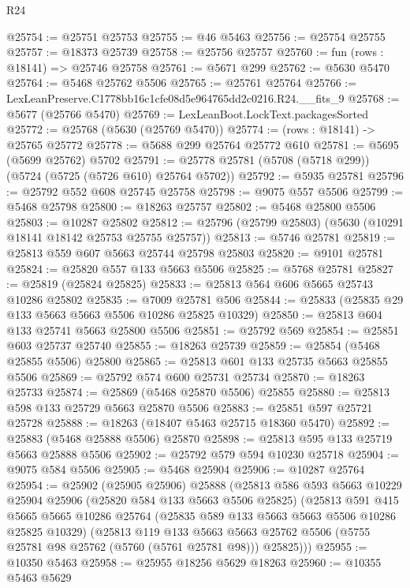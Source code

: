 \begin{lexlean}{R24}
\begin{coremodule}
@25754 := @25751 @25753
@25755 := @46 @5463
@25756 := @25754 @25755
@25757 := @18373 @25739
@25758 := @25756 @25757
@25760 := fun (rows : @18141) => @25746 @25758
@25761 := @5671 @299
@25762 := @5630 @5470
@25764 := @5468 @25762 @5506
@25765 := @25761 @25764
@25766 := LexLeanPreserve.C1778bb16c1cfe08d5e964765dd2c0216.R24.__fits_9
@25768 := @5677 (@25766 @5470)
@25769 := LexLeanBoot.LockText.packagesSorted
@25772 := @25768 (@5630 (@25769 @5470))
@25774 := (rows : @18141) -> @25765 @25772
@25778 := @5688 @299 @25764 @25772 @610
@25781 := @5695 (@5699 @25762) @5702
@25791 := @25778 @25781 (@5708 (@5718 @299)) (@5724 (@5725 (@5726 @610) @25764 @5702))
@25792 := @5935 @25781
@25796 := @25792 @552 @608 @25745 @25758
@25798 := @9075 @557 @5506
@25799 := @5468 @25798
@25800 := @18263 @25757
@25802 := @5468 @25800 @5506
@25803 := @10287 @25802
@25812 := @25796 (@25799 @25803) (@5630 (@10291 @18141 @18142 @25753 @25755 @25757))
@25813 := @5746 @25781
@25819 := @25813 @559 @607 @5663 @25744 @25798 @25803
@25820 := @9101 @25781
@25824 := @25820 @557 @133 @5663 @5506
@25825 := @5768 @25781
@25827 := @25819 (@25824 @25825)
@25833 := @25813 @564 @606 @5665 @25743 @10286 @25802
@25835 := @7009 @25781 @506
@25844 := @25833 (@25835 @29 @133 @5663 @5663 @5506 @10286 @25825 @10329)
@25850 := @25813 @604 @133 @25741 @5663 @25800 @5506
@25851 := @25792 @569
@25854 := @25851 @603 @25737 @25740
@25855 := @18263 @25739
@25859 := @25854 (@5468 @25855 @5506) @25800
@25865 := @25813 @601 @133 @25735 @5663 @25855 @5506
@25869 := @25792 @574 @600 @25731 @25734
@25870 := @18263 @25733
@25874 := @25869 (@5468 @25870 @5506) @25855
@25880 := @25813 @598 @133 @25729 @5663 @25870 @5506
@25883 := @25851 @597 @25721 @25728
@25888 := @18263 (@18407 @5463 @25715 @18360 @5470)
@25892 := @25883 (@5468 @25888 @5506) @25870
@25898 := @25813 @595 @133 @25719 @5663 @25888 @5506
@25902 := @25792 @579 @594 @10230 @25718
@25904 := @9075 @584 @5506
@25905 := @5468 @25904
@25906 := @10287 @25764
@25954 := @25902
    (@25905 @25906)
    @25888
    (@25813
      @586
      @593
      @5663
      @10229
      @25904
      @25906
      (@25820 @584 @133 @5663 @5506 @25825)
      (@25813
        @591
        @415
        @5665
        @5665
        @10286
        @25764
        (@25835 @589 @133 @5663 @5663 @5506 @10286 @25825 @10329)
        (@25813
          @119
          @133
          @5663
          @5663
          @25762
          @5506
          (@5755 @25781 @98 @25762 (@5760 (@5761 @25781 @98)))
          @25825)))
@25955 := @10350 @5463
@25958 := @25955 @18256 @5629 @18263
@25960 := @10355 @5463 @5629

\end{coremodule}
\end{lexlean}
